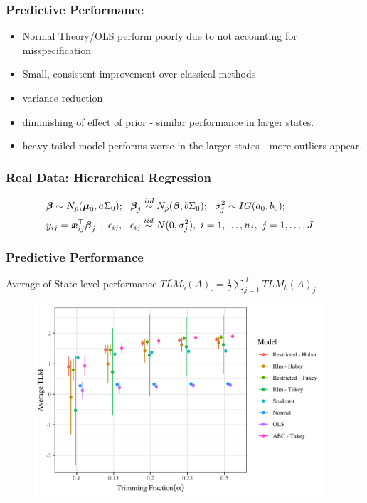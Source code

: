 \documentclass{beamer}
\def\bbeta{\mbox{\boldmath $\beta$}}
\def\bmu{\mbox{\boldmath $\mu$}}
\newcommand{\bx}{\mbox{\boldmath $x$}}
\newcommand{\iid}{\stackrel{iid}{\sim}}
\begin{document}
\begin{frame}
	\frametitle{Predictive Performance}
\begin{itemize}
\item Normal Theory/OLS perform poorly due to not accounting for misspecification
\item Small, consistent improvement over classical methods
\item variance reduction 
\item diminishing of effect of prior - similar performance in larger states. 
\item heavy-tailed model performs worse in the larger states - more outliers appear. 
\end{itemize}
	
\end{frame}


%	
%
%	


\begin{frame}
\frametitle{Real Data: Hierarchical Regression}
\begin{align*}
\label{eq:hierModel}
&\bbeta\sim N_p(\bmu_0, a\Sigma_0);\ \ 
\bbeta_j\iid N_p(\bbeta, b\Sigma_0); \ \  
\sigma_j^2\sim IG(a_0,b_0);  & \\ 
& y_{ij}=\bx_{ij}^\top\bbeta_j+\epsilon_{ij},\ \ \epsilon_{ij}\iid N(0, \sigma_j^2),\ i=1,\dots, n_j,\ j=1,\dots, J &
\end{align*}	
\end{frame}

\begin{frame}
	\frametitle{Predictive Performance}
Average of State-level performance $\overline{TLM}_b(A)_{\cdot}= \frac{1}{J} \sum_{j =1}^{J} TLM_b(A)_{j}$
\begin{figure}[t]
	\centering
	\includegraphics[width=4.25in]{hier_average_tlm.png}
	\label{fig:hierTLM}
\end{figure}
\end{frame}
\end{document}
